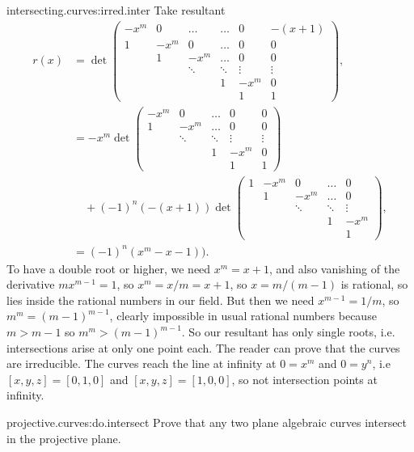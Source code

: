 \begin{answer}{intersecting.curves:irred.inter}
Take resultant
\begin{align*}
r(x)
&=
\det
\begin{pmatrix}
-x^m & 0  & \dots & \dots & 0 & -(x+1) \\
    1&-x^m& 0     & \dots & 0 & 0 \\
     &   1& -x^m  & \dots & 0 & 0 \\
     &    & \ddots& \ddots & \vdots & \vdots \\
     &    &       & 1      & -x^m & 0 \\
     &    &       &        &  1 & 1           
\end{pmatrix},\\
&=
-x^m
\det
\begin{pmatrix}
-x^m& 0     & \dots & 0 & 0 \\
   1& -x^m  & \dots & 0 & 0 \\
    & \ddots& \ddots & \vdots & \vdots \\
    &       & 1      & -x^m & 0 \\
    &       &        &  1 & 1           
\end{pmatrix}\\
&\quad+
(-1)^n(-(x+1))
\det
\begin{pmatrix}
    1&-x^m& 0     & \dots & 0 \\
     &   1& -x^m  & \dots & 0 \\
     &    & \ddots& \ddots & \vdots \\
     &    &       & 1      & -x^m \\
     &    &       &        &  1           
\end{pmatrix},\\
&=
(-1)^n(x^m-x-1)).
\end{align*}
To have a double root or higher, we need \(x^m=x+1\), and also vanishing of the derivative \(mx^{m-1}=1\), so \(x^m=x/m=x+1\), so \(x=m/(m-1)\) is rational, so lies inside the rational numbers in our field.
But then we need \(x^{m-1}=1/m\), so \(m^m=(m-1)^{m-1}\), clearly impossible in usual rational numbers because \(m>m-1\) so \(m^m>(m-1)^{m-1}\).
So our resultant has only single roots, i.e. intersections arise at only one point each.
The reader can prove that the curves are irreducible.
The curves reach the line at infinity at \(0=x^m\) and \(0=y^n\), i.e \([x,y,z]=[0,1,0]\) and \([x,y,z]=[1,0,0]\), so not intersection points at infinity.
\end{answer}
\begin{problem}{projective.curves:do.intersect}
Prove that any two plane algebraic curves intersect in the projective plane.
\end{problem}
